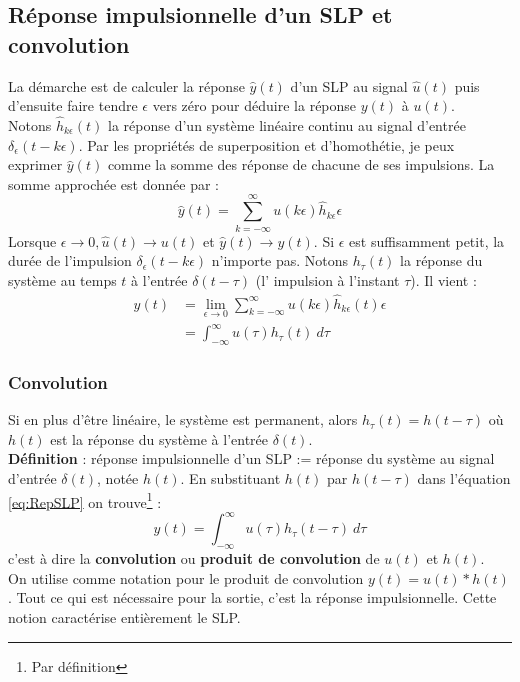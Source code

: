 	\subsection{Réponse impulsionnelle d'un SLP et convolution}
	La démarche est de calculer la réponse $\hat{y}(t)$ d'un SLP au signal
	$\hat{u}(t)$ puis d'ensuite faire tendre $\epsilon$ vers zéro pour 
	déduire la réponse $y(t)$ à $u(t)$.\\
	Notons $\hat{h}_{k\epsilon}(t)$ la réponse d'un système linéaire continu 
	au signal d'entrée $\delta_\epsilon(t-k\epsilon)$. Par les propriétés de 
	superposition et d'homothétie, je peux exprimer $\hat{y}(t)$ comme la 
	somme des réponse de chacune de ses impulsions. La somme approchée est 
	donnée par : 
	\begin{equation}
	\hat{y}(t) = \sum_{k=-\infty}^\infty u(k\epsilon)\hat{h}_{k\epsilon}
	\epsilon
	\end{equation}
	Lorsque $\epsilon\rightarrow0, \hat{u}(t)\rightarrow u(t)$ et $\hat{y}
	(t) \rightarrow y(t)$. Si $\epsilon$ est suffisamment petit, la durée de 
	l'impulsion $\delta_\epsilon(t-k\epsilon)$ n'importe pas. Notons $h_\tau(t
	)$ la réponse du système au temps $t$ à l'entrée $\delta(t-\tau)$ (l'
	impulsion à l'instant $\tau$). Il vient : 
	\begin{equation}
	\begin{array}{ll}
	y(t) &= \lim\limits_{\epsilon\rightarrow0} \sum_{k=-\infty}^\infty u(k\epsilon)
	\hat{h}_{k\epsilon}(t)\epsilon\\
	 &= \int_{-\infty}^\infty u(\tau)h_\tau(t)\ d\tau
	\end{array}
	\label{eq:RepSLP}
	\end{equation}
	
		 \subsubsection{Convolution}
		 Si en plus d'\^etre linéaire, le système est permanent, alors $h_\tau(
		 t) = h(t-\tau)$ où $h(t)$ est la réponse du système à l'entrée $\delta
		 (t)$.\\
		 \textbf{Définition} : réponse impulsionnelle d'un SLP := réponse du
		 système au signal d'entrée $\delta(t)$, notée $h(t)$. En substituant 
		 $h(t)$ par $h(t-\tau)$ dans l'équation \autoref{eq:RepSLP} on 
		 trouve\footnote{Par définition} :
		 \begin{equation}
		 y(t) = \int_{-\infty}^\infty u(\tau)h_\tau(t-\tau)\ d\tau
		 \end{equation}
		 c'est à dire la \textbf{convolution} ou \textbf{produit de convolution} 
		 de $u(t)$ et $h(t)$.\\
		 On utilise comme notation pour le produit de convolution $y(t) = u(t)*
		 h(t)$. Tout ce qui est nécessaire pour la sortie, c'est la réponse 
		 impulsionnelle. Cette notion caractérise entièrement le SLP.
	
